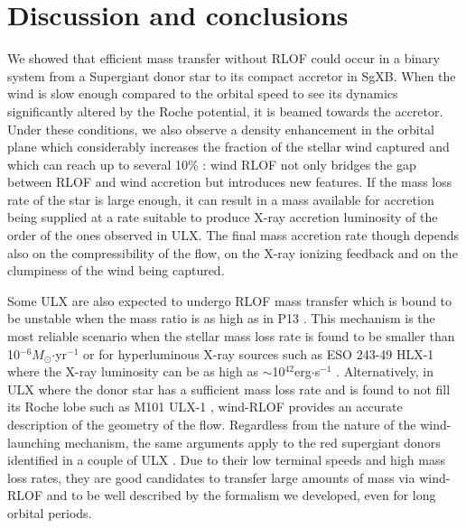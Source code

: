 \documentclass[letter]{aa}
\makeatletter
\newcommand{\sgx}{SgXB\xspace}
\newcommand{\ulx}{ULX\xspace}
\newcommand*{\rlof}{RLOF\@\xspace}
\newcommand*{\msun}{$M_{\odot}$\@\xspace}
\makeatother
\begin{document}
\section{Discussion and conclusions}
\label{sec:}


We showed that efficient mass transfer without \rlof could occur in a binary system from a Supergiant donor star to its compact accretor in \sgx. When the wind is slow enough compared to the orbital speed to see its dynamics significantly altered by the Roche potential, it is beamed towards the accretor. Under these conditions, we also observe a density enhancement in the orbital plane which considerably increases the fraction of the stellar wind captured and which can reach up to several 10\% : wind \rlof not only bridges the gap between \rlof and wind accretion but introduces new features. If the mass loss rate of the star is large enough, it can result in a mass available for accretion being supplied at a rate suitable to produce X-ray accretion luminosity of the order of the ones observed in \ulx. The final mass accretion rate though depends also on the compressibility of the flow, on the X-ray ionizing feedback and on the clumpiness of the wind being captured.

Some \ulx are also expected to undergo \rlof mass transfer which is bound to be unstable when the mass ratio is as high as in P13 \citep{King2002,Rappaport2005}. This mechanism is the most reliable scenario when the stellar mass loss rate is found to be smaller than 10$^{-6}$\msun$\cdot$yr$^{-1}$ or for hyperluminous X-ray sources such as ESO 243-49 HLX-1 where the X-ray luminosity can be as high as $\sim$10$^{42}$erg$\cdot$s$^{-1}$ \citep{Farrell2009,Webb2017}. Alternatively, in \ulx where the donor star has a sufficient mass loss rate and is found to not fill its Roche lobe such as M101 ULX-1 \citep{Liu2013}, wind-\rlof provides an accurate description of the geometry of the flow. Regardless from the nature of the wind-launching mechanism, the same arguments apply to the red supergiant donors identified in a couple of ULX \citep{Heida2015,Heida2016}. Due to their low terminal speeds and high mass loss rates, they are good candidates to transfer large amounts of mass via wind-\rlof \citep{Mohamed2007,DeVal-Borro2017} and to be well described by the formalism we developed, even for long orbital periods.
\end{document}
